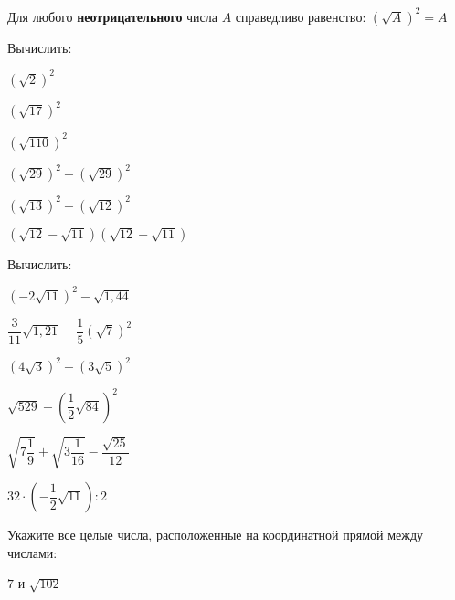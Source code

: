 \begin{class}[number=2]
\begin{listofex}[resume]
\begin{enumcols}[itemcolumns=5]
		\end{enumcols}
	\end{listofex}
	\begin{definit}
		Для любого \textbf{неотрицательного} числа \( A \) справедливо равенство: \( \left( \sqrt{A} \right)^2=A \)
	\end{definit}
	\begin{listofex}[resume]
		\item Вычислить:
		\begin{enumcols}[itemcolumns=3]
			\item \( (\sqrt{2})^2 \)
			\item \( (\sqrt{17})^2 \)
			\item \( (\sqrt{110})^2 \)
			\item \( (\sqrt{29})^2+(\sqrt{29})^2 \)
			\item \( (\sqrt{13})^2-(\sqrt{12})^2 \)
			\item \( (\sqrt{12}-\sqrt{11})(\sqrt{12}+\sqrt{11}) \)
		\end{enumcols}
		\item Вычислить:
		\begin{enumcols}[itemcolumns=3]
			\item \( (-2\sqrt{11})^2-\sqrt{1,44} \)
			\item \( \dfrac{3}{11}\sqrt{1,21}-\dfrac{1}{5}(\sqrt{7})^2 \)
			\item \( (4\sqrt{3})^2-(3\sqrt{5})^2 \)
			\item \( \sqrt{529}-\left( \dfrac{1}{2}\sqrt{84} \right)^2 \)
			\item \( \sqrt{7\dfrac{1}{9}}+\sqrt{3\dfrac{1}{16}}-\dfrac{\sqrt{25}}{12} \)
			\item \( 32\cdot\left( -\dfrac{1}{2}\sqrt{11} \right):2 \)
		\end{enumcols}
		\item Укажите все целые числа, расположенные на координатной прямой между числами:
		\begin{enumcols}[itemcolumns=4]
			\item \( 7 \) и \( \sqrt{102} \)

\end{enumcols}
\end{listofex}
\end{class}
